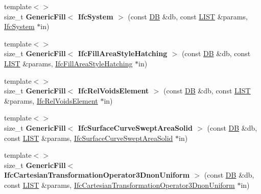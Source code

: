 \begin{DoxyCompactItemize}
\item 
\hypertarget{namespace_assimp_1_1_s_t_e_p_a5e224f3c83e19ebedeaf196be114b5c3}{{\footnotesize template$<$$>$ }\\size\+\_\+t {\bfseries Generic\+Fill$<$ Ifc\+System $>$} (const \hyperlink{class_assimp_1_1_s_t_e_p_1_1_d_b}{D\+B} \&db, const \hyperlink{class_assimp_1_1_s_t_e_p_1_1_e_x_p_r_e_s_s_1_1_l_i_s_t}{L\+I\+S\+T} \&params, \hyperlink{struct_assimp_1_1_i_f_c_1_1_ifc_system}{Ifc\+System} $\ast$in)}\label{namespace_assimp_1_1_s_t_e_p_a5e224f3c83e19ebedeaf196be114b5c3}

\item 
\hypertarget{namespace_assimp_1_1_s_t_e_p_a3144bdee0eccff72994ae3aecd0b903c}{{\footnotesize template$<$$>$ }\\size\+\_\+t {\bfseries Generic\+Fill$<$ Ifc\+Fill\+Area\+Style\+Hatching $>$} (const \hyperlink{class_assimp_1_1_s_t_e_p_1_1_d_b}{D\+B} \&db, const \hyperlink{class_assimp_1_1_s_t_e_p_1_1_e_x_p_r_e_s_s_1_1_l_i_s_t}{L\+I\+S\+T} \&params, \hyperlink{struct_assimp_1_1_i_f_c_1_1_ifc_fill_area_style_hatching}{Ifc\+Fill\+Area\+Style\+Hatching} $\ast$in)}\label{namespace_assimp_1_1_s_t_e_p_a3144bdee0eccff72994ae3aecd0b903c}

\item 
\hypertarget{namespace_assimp_1_1_s_t_e_p_affc1490190ba8773b29989f5432f4522}{{\footnotesize template$<$$>$ }\\size\+\_\+t {\bfseries Generic\+Fill$<$ Ifc\+Rel\+Voids\+Element $>$} (const \hyperlink{class_assimp_1_1_s_t_e_p_1_1_d_b}{D\+B} \&db, const \hyperlink{class_assimp_1_1_s_t_e_p_1_1_e_x_p_r_e_s_s_1_1_l_i_s_t}{L\+I\+S\+T} \&params, \hyperlink{struct_assimp_1_1_i_f_c_1_1_ifc_rel_voids_element}{Ifc\+Rel\+Voids\+Element} $\ast$in)}\label{namespace_assimp_1_1_s_t_e_p_affc1490190ba8773b29989f5432f4522}

\item 
\hypertarget{namespace_assimp_1_1_s_t_e_p_a7556898bfe9139335269054eea49bdab}{{\footnotesize template$<$$>$ }\\size\+\_\+t {\bfseries Generic\+Fill$<$ Ifc\+Surface\+Curve\+Swept\+Area\+Solid $>$} (const \hyperlink{class_assimp_1_1_s_t_e_p_1_1_d_b}{D\+B} \&db, const \hyperlink{class_assimp_1_1_s_t_e_p_1_1_e_x_p_r_e_s_s_1_1_l_i_s_t}{L\+I\+S\+T} \&params, \hyperlink{struct_assimp_1_1_i_f_c_1_1_ifc_surface_curve_swept_area_solid}{Ifc\+Surface\+Curve\+Swept\+Area\+Solid} $\ast$in)}\label{namespace_assimp_1_1_s_t_e_p_a7556898bfe9139335269054eea49bdab}

\item 
\hypertarget{namespace_assimp_1_1_s_t_e_p_a837e75fbf69aa9688f2361c17cd2080e}{{\footnotesize template$<$$>$ }\\size\+\_\+t {\bfseries Generic\+Fill$<$ Ifc\+Cartesian\+Transformation\+Operator3\+Dnon\+Uniform $>$} (const \hyperlink{class_assimp_1_1_s_t_e_p_1_1_d_b}{D\+B} \&db, const \hyperlink{class_assimp_1_1_s_t_e_p_1_1_e_x_p_r_e_s_s_1_1_l_i_s_t}{L\+I\+S\+T} \&params, \hyperlink{struct_assimp_1_1_i_f_c_1_1_ifc_cartesian_transformation_operator3_dnon_uniform}{Ifc\+Cartesian\+Transformation\+Operator3\+Dnon\+Uniform} $\ast$in)}\label{namespace_assimp_1_1_s_t_e_p_a837e75fbf69aa9688f2361c17cd2080e}


\end{DoxyCompactItemize}
